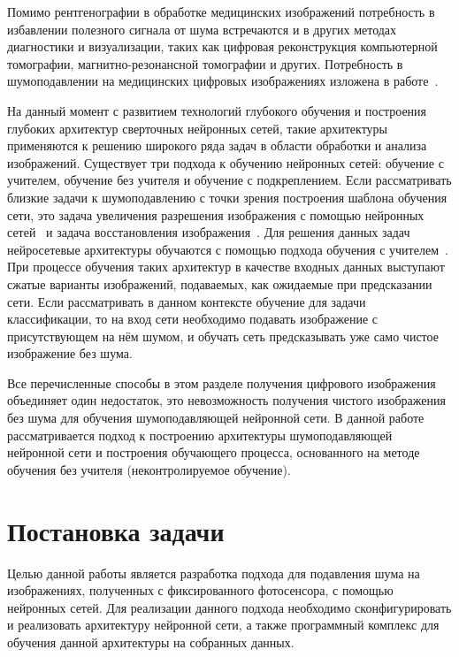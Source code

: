 \documentclass[14pt]{mmcs_article}
\begin{document}
Помимо рентгенографии в обработке медицинских изображений потребность в избавлении полезного сигнала от шума встречаются и в других методах диагностики и визуализации, таких как цифровая реконструкция компьютерной томографии, магнитно-резонансной томографии и других. Потребность в шумоподавлении на медицинских цифровых изображениях изложена в работе~\autocite{MedicalImagesProcessing}.

На данный момент с развитием технологий глубокого обучения и построения глубоких архитектур сверточных нейронных сетей, такие архитектуры применяются к решению широкого ряда задач в области обработки и анализа изображений. Существует три подхода к обучению нейронных сетей: обучение с учителем, обучение без учителя и обучение с подкреплением. Если рассматривать близкие задачи к шумоподавлению с точки зрения построения шаблона обучения сети, это задача увеличения разрешения изображения с помощью нейронных сетей~\autocite{SuperResolutuion:journals/corr/abs-1807-02758} и задача восстановления изображения~\autocite{ImageReconstruction}. Для решения данных задач нейросетевые архитектуры обучаются с помощью подхода обучения с учителем~\autocite{SupervisedLearningReview}. При процессе обучения таких архитектур в качестве входных данных выступают сжатые варианты изображений, подаваемых, как ожидаемые при предсказании сети. Если рассматривать в данном контексте обучение для задачи классификации, то на вход сети необходимо подавать изображение с присутствующем на нём шумом, и обучать сеть предсказывать уже само чистое изображение без шума. 

Все перечисленные способы в этом разделе получения цифрового изображения объединяет один недостаток, это невозможность получения чистого изображения без шума для обучения шумоподавляющей нейронной сети. В данной работе рассматривается подход к построению архитектуры шумоподавляющей нейронной сети и построения обучающего процесса, основанного на методе обучения без учителя (неконтролируемое обучение).


\newpage

\section{Постановка задачи}\label{sec:set_task}
Целью данной работы является разработка подхода для подавления шума на изображениях, полученных с фиксированного фотосенсора, с помощью нейронных сетей. Для реализации данного подхода необходимо сконфигурировать и реализовать архитектуру нейронной сети, а также программный комплекс для обучения данной архитектуры на собранных данных.
\end{document}
